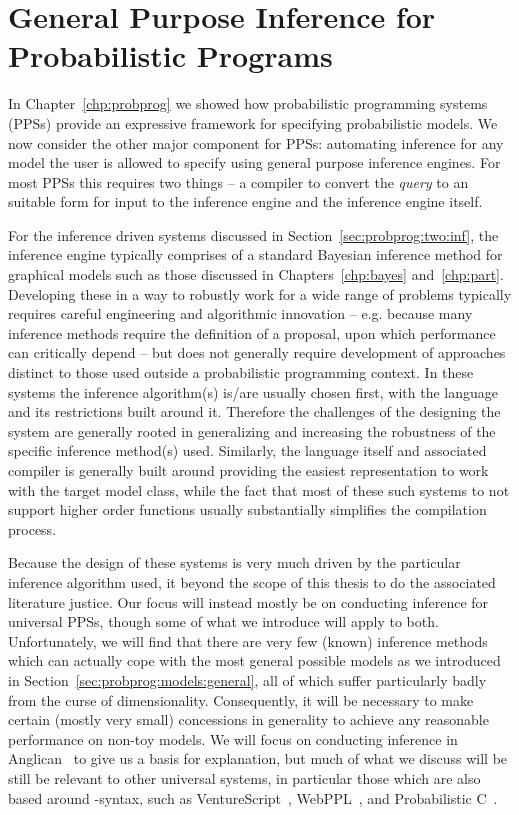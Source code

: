 
\chapter{General Purpose Inference for Probabilistic Programs}
\label{chp:proginf}

In Chapter~\ref{chp:probprog} we showed how probabilistic programming systems (PPSs) provide
an expressive framework for specifying probabilistic models.  We now consider the other major component
for PPSs: automating inference for any model the user is allowed to specify using general purpose
inference engines.  For most PPSs this requires two things --  a compiler to convert the \emph{query} to an
suitable form for input to the inference engine and the inference engine itself.  

For the inference
driven systems discussed in Section~\ref{sec:probprog:two:inf}, the inference engine typically comprises of
a standard Bayesian inference method for graphical models such as those discussed in Chapters~\ref{chp:bayes}
and~\ref{chp:part}.  Developing these in a way to robustly work for a wide range of problems typically
requires careful engineering and algorithmic innovation -- e.g. because many inference methods require the definition of
a proposal, upon which performance can critically depend -- but does not generally require development 
of approaches distinct to those used outside a probabilistic programming context.  In these 
systems the inference algorithm(s) is/are usually chosen first, with the language and its restrictions built around it.
Therefore the challenges of the designing the system are generally rooted in generalizing and increasing the robustness of the 
specific inference method(s) used.  Similarly, the language itself and associated compiler is generally built
around providing the easiest representation to work with the target model class, while the fact that most of
these such systems to not support higher order functions usually substantially simplifies the compilation
process.

Because the design of these systems is very much driven by the particular inference algorithm used, it
beyond the scope of this thesis to do the associated literature justice.  Our focus will instead mostly be on 
conducting inference for universal PPSs, though some of what we introduce will apply to both.
Unfortunately, we will find that there are very few (known) inference
methods which can actually cope with the most general possible models as we introduced in
Section~\ref{sec:probprog:models:general}, all of which suffer particularly badly from the curse of
dimensionality.  Consequently, it will be necessary to make certain (mostly very small) concessions in 
generality to achieve any reasonable performance on non-toy models.  We will focus on conducting
inference in Anglican~\citep{wood2014new,tolpin2016design} to give us a basis for explanation, but much of
what we discuss will be still be relevant to other universal systems, in particular those which
are also based around \sample-\observe syntax, such as VentureScript~\citep{mansinghka2014venture}, 
WebPPL~\citep{goodman_book_2014}, and Probabilistic C~\citep{paige2014compilation}.

